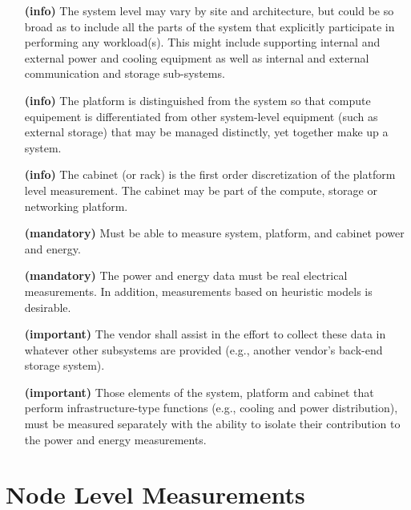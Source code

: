 \begin{itemize}
\item[\textbf{(info)}]
The system level may vary by site and architecture, but could be so broad as to 
include all the parts of the system that explicitly participate in performing 
any workload(s). This might include supporting internal and external power and 
cooling equipment as well as internal and external communication and storage sub-systems. 

\item[\textbf{(info)}]
The platform is distinguished from the system so 
that compute equipement is differentiated from 
other system-level equipment (such as external storage) that may be managed distinctly,
yet together make up a system. 

\item[\textbf{(info)}]
The cabinet (or rack) is the first order discretization of the platform 
level measurement. The cabinet may be part of the compute, storage or networking platform. 

\item[\textbf{(mandatory)}]
Must be able to measure system, platform, and cabinet power and energy.

\item[\textbf{(mandatory)}]
The power and energy data must be real electrical measurements. In addition, measurements 
based on heuristic models is desirable.

\item[\textbf{(important)}]
The vendor shall assist in the effort to collect these data in whatever other 
subsystems are provided (e.g., another vendor’s back-end storage system). 

\item[\textbf{(important)}]
Those elements of the system, platform and cabinet that perform infrastructure-type 
functions (e.g., cooling and power distribution), must be measured separately with the 
ability to isolate their contribution to the power and energy measurements.  

\end{itemize}

\section{Node Level Measurements}

